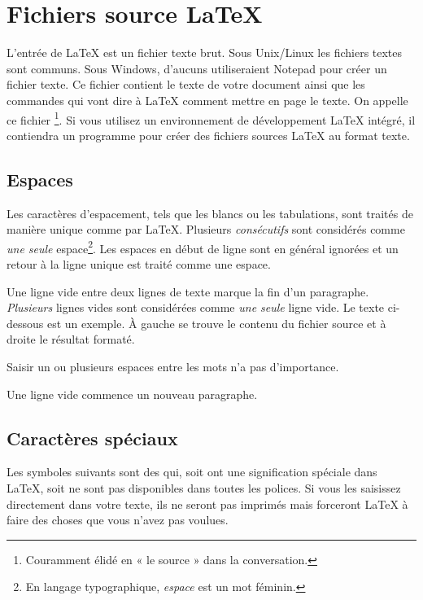 \section{Fichiers source \LaTeX{}}

L'entrée de \LaTeX{} est un fichier texte brut. Sous Unix/Linux les
fichiers textes sont communs. Sous Windows, d'aucuns utiliseraient
Notepad pour créer un fichier texte. Ce fichier contient le texte
de votre document ainsi que les commandes qui vont dire à \LaTeX{}
comment mettre en page le texte. On appelle ce fichier \emph{}\footnote{Couramment élidé en « le source » dans la
conversation. \NdT}. Si vous utilisez un environnement de
développement \LaTeX{} intégré, il contiendra un programme pour créer des
fichiers sources \LaTeX{} au format texte.

\subsection{Espaces}

Les caractères d'espacement, tels que les blancs ou les tabulations,
sont traités de manière unique comme \og {} \fg{} par
\LaTeX{}. Plusieurs  \emph{consécutifs} sont considérés
comme \emph{une seule} espace\footnote{En langage typographique,
    \emph{espace} est un mot féminin. \NdT}.  Les espaces en début
de ligne sont en général ignorées et un retour à la ligne unique est
traité comme une espace.  

Une ligne vide entre deux lignes de texte marque la fin d'un
paragraphe. \emph{Plusieurs} lignes vides sont considérées comme
\emph{une seule} ligne vide. Le texte ci-dessous est un exemple. À
gauche se trouve le contenu du fichier source et à droite le
résultat formaté.

\begin{example}
Saisir un ou      plusieurs
espaces entre  les     mots
n'a pas d'importance.

Une ligne vide commence
un nouveau paragraphe.
\end{example}

\subsection{Caractères spéciaux}

Les symboles suivants sont des  qui, soit ont
une signification spéciale dans \LaTeX{}, soit ne sont pas disponibles
dans toutes les polices. Si vous les saisissez directement dans votre
texte, ils ne seront pas imprimés mais forceront \LaTeX{} à faire des
choses que vous n'avez pas voulues.

